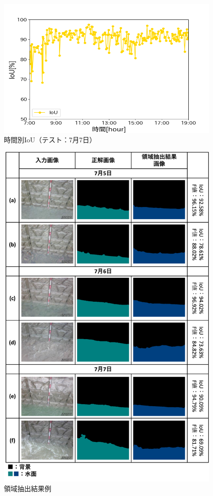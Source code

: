 \begin{figure}[ht] 
  \begin{center}
    \includegraphics[width=\linewidth]{image/0707_IoU_kousa.png}
  \end{center}
  \caption{時間別IoU（テスト：7月7日）}
  \label{kousa_IoU_0707}
\end{figure}

\begin{figure}[t] 
  \begin{center}
    \includegraphics[width=120mm]{image/image_kousa.png}
  \end{center}
  \caption{領域抽出結果例}
  \label{images_kousa}
\end{figure}

